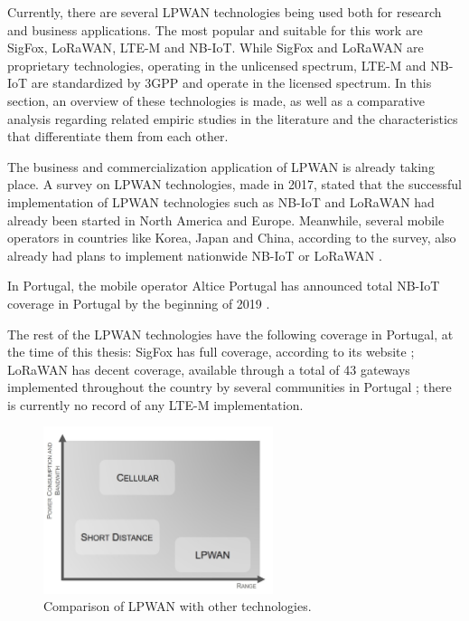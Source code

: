 Currently, there are several LPWAN technologies being used both for research and business applications. The most popular and suitable for this work are SigFox, \ac{LoRaWAN}, \ac{LTE-M} and NB-IoT. While SigFox and LoRaWAN are proprietary technologies, operating in the unlicensed spectrum, LTE-M and NB-IoT are standardized by \ac{3GPP} and operate in the licensed spectrum. In this section, an overview of these technologies is made, as well as a comparative analysis regarding related empiric studies in the literature and the characteristics that differentiate them from each other.

The business and commercialization application of LPWAN is already taking place. A survey on LPWAN technologies, made in 2017, stated that the successful implementation of LPWAN technologies such as NB-IoT and LoRaWAN had already been started in North America and Europe. Meanwhile, several mobile operators in countries like Korea, Japan and China, according to the survey, also already had plans to implement nationwide NB-IoT or LoRaWAN \cite{Sinha2017}. 

In Portugal, the mobile operator Altice Portugal has announced total NB-IoT coverage in Portugal by the beginning of 2019 \cite{Altice2018}. 

The rest of the LPWAN technologies have the following coverage in Portugal, at the time of this thesis: SigFox has full coverage, according to its website \cite{SigFox2018}; LoRaWAN has decent coverage, available through a total of 43 gateways implemented throughout the country by several communities in Portugal \cite{ThingsNetwork2019}; there is currently no record of any LTE-M implementation. 

\begin{figure}[ht]
\centering
\includegraphics[width=0.6\textwidth]{./Images/ieec4.jpg}
\caption{Comparison of LPWAN with other technologies.}
\label{fig:ieec4}
\end{figure}

